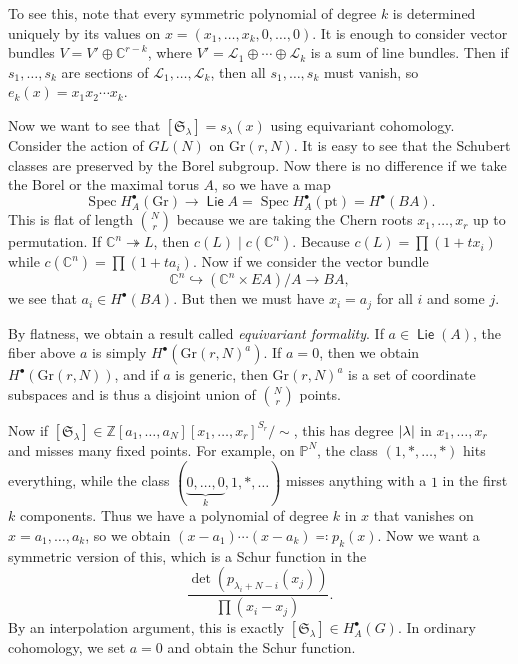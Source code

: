 \documentclass[leqno, openany]{memoir}
\theoremstyle{definition}
\theoremstyle{remark}
\theoremstyle{plain}
\theoremstyle{definition}
\theoremstyle{remark}
\newcommand{\C}{\mathbb{C}}
\newcommand{\Z}{\mathbb{Z}}
\renewcommand{\P}{\mathbb{P}}
\newcommand{\mf}[1]{\mathfrak{#1}}
\newcommand{\mr}[1]{\mathrm{#1}}
\newcommand{\msc}[1]{\mathscr{#1}}
\DeclareMathOperator{\Spec}{Spec}
\DeclareMathOperator{\Lie}{\mathsf{Lie}}
\begin{document}
To see this, note that every symmetric polynomial of degree $k$ is determined uniquely by its values on $x = (x_1, \ldots, x_k, 0, \ldots, 0)$. It is enough to consider vector bundles $V = V' \oplus \C^{r-k}$, where $V' = \msc{L}_1 \oplus \cdots \oplus \msc{L}_k$ is a sum of line bundles. Then if $s_1, \ldots, s_k$ are sections of $\msc{L}_1, \ldots, \msc{L}_k$, then all $s_1, \ldots, s_k$ must vanish, so $e_k(x) = x_1 x_2 \cdots x_k$.

Now we want to see that $[\mf{S}_{\lambda}] = s_{\lambda}(x)$ using equivariant cohomology. Consider the action of $GL(N)$ on $\mr{Gr}(r, N)$. It is easy to see that the Schubert classes are preserved by the Borel subgroup. Now there is no difference if we take the Borel or the maximal torus $A$, so we have a map
\[ \Spec H_A^{\bullet}(\mr{Gr}) \to \Lie A = \Spec H_A^{\bullet}(\mr{pt}) = H^{\bullet}(BA). \]
This is flat of length $\binom{N}{r}$ because we are taking the Chern roots $x_1, \ldots, x_r$ up to permutation. If $\C^n \twoheadrightarrow L$, then $c(L) \mid c(\C^n)$. Because $c(L) = \prod (1+t x_i)$ while $c(\C^n) = \prod (1+t a_i)$. Now if we consider the vector bundle
\[ \C^n \hookrightarrow (\C^n \times EA)/A \to BA ,\]
we see that $a_i \in H^{\bullet}(BA)$. But then we must have $x_i = a_j$ for all $i$ and some $j$.

By flatness, we obtain a result called \textit{equivariant formality}. If $a \in \Lie(A)$, the fiber above $a$ is simply $H^{\bullet}({\mr{Gr}(r, N)}^a)$. If $a = 0$, then we obtain $H^{\bullet}(\mr{Gr}(r, N))$, and if $a$ is generic, then ${\mr{Gr}(r, N)}^a$ is a set of coordinate subspaces and is thus a disjoint union of $\binom{N}{r}$ points. 

Now if $[\mf{S}_{\lambda}] \in { \Z[a_1, \ldots, a_N][x_1, \ldots, x_r] }^{S_r} / \sim$, this has degree $\abs{\lambda}$ in $x_1, \ldots, x_r$ and misses many fixed points. For example, on $\P^N$, the class $(1,*,\ldots, *)$ hits everything, while the class $(\underbrace{0, \ldots, 0}_k, 1, *, \ldots)$ misses anything with a $1$ in the first $k$ components. Thus we have a polynomial of degree $k$ in $x$ that vanishes on $x = a_1, \ldots, a_k$, so we obtain $(x - a_1) \cdots (x-a_k) \eqqcolon p_k(x)$. Now we want a symmetric version of this, which is a Schur function in the 
\[ \frac{\det (p_{\lambda_i + N - i}(x_j))}{\prod (x_i - x_j)}. \]
By an interpolation argument, this is exactly $[\mf{S}_{\lambda}] \in H_A^{\bullet}(G)$. In ordinary cohomology, we set $a = 0$ and obtain the Schur function.
\end{document}
